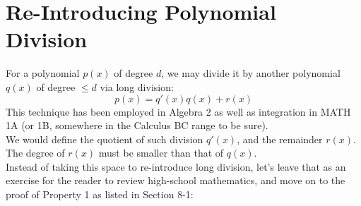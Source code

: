 \section{Re-Introducing Polynomial Division}
For a polynomial $p(x)$ of degree $d$, we may divide it by another polynomial $q(x)$ of degree $\leq d$ via long division:
\[p(x) = q'(x) q(x) + r(x)\]
This technique has been employed in Algebra 2 as well as integration in MATH 1A (or 1B, somewhere in the Calculus BC range to be sure). \\
We would define the quotient of such division $q'(x)$, and the remainder $r(x)$. The degree of $r(x)$ must be smaller than that of $q(x)$. \\
Instead of taking this space to re-introduce long division, let's leave that as an exercise for the reader to review high-school mathematics, and move on to the proof of Property 1 as listed in Section 8-1:
